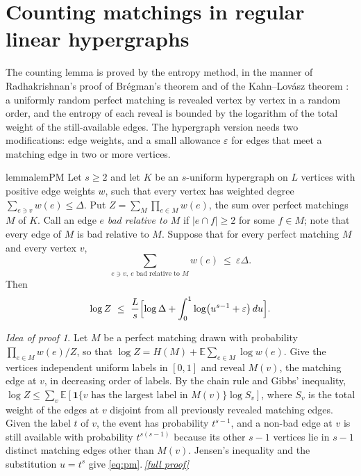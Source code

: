 \documentclass[11pt,a4paper]{article}
\theoremstyle{plain}
\theoremstyle{definition}
\theoremstyle{remark}
\newtheorem*{proofidea}{Idea of proof}
\newcommand{\fullproofref}[1]{\,\hyperref[#1]{\textit{[full proof]}}}
\newcommand{\E}{\mathbb E}
\newcommand{\ind}{\mathbf 1}
\begin{document}
\section{Counting matchings in regular linear hypergraphs}\label{sec:count}

The counting lemma is proved by the entropy method, in the manner of Radhakrishnan's proof of Br\'egman's theorem \cite{Bregman73,Radhakrishnan97} and of the Kahn--Lov\'asz theorem \cite{AF08,CR11}: a uniformly random perfect matching is revealed vertex by vertex in a random order, and the entropy of each reveal is bounded by the logarithm of the total weight of the still-available edges. The hypergraph version needs two modifications: edge weights, and a small allowance $\varepsilon$ for edges that meet a matching edge in two or more vertices.

\begin{restatable}{lemma}{lemPM}\label{lem:pm}
Let $s\ge2$ and let $K$ be an $s$-uniform hypergraph on $L$ vertices with positive edge weights $w$, such that every vertex has weighted degree $\sum_{e\ni v}w(e)\le\Delta$. Put $Z=\sum_{M}\prod_{e\in M}w(e)$, the sum over perfect matchings $M$ of $K$. Call an edge $e$ \emph{bad relative to $M$} if $|e\cap f|\ge2$ for some $f\in M$; note that every edge of $M$ is bad relative to $M$. Suppose that for every perfect matching $M$ and every vertex $v$,
\begin{equation}\label{eq:badhyp}
\sum_{e\ni v,\ e\text{ bad relative to }M}w(e)\ \le\ \varepsilon\Delta .
\end{equation}
Then
\begin{equation}\label{eq:pm}
\log Z\ \le\ \frac Ls\Bigl[\log\Delta+\int_0^1\log\bigl(u^{s-1}+\varepsilon\bigr)\,du\Bigr].
\end{equation}
\end{restatable}

\begin{proofidea}
Let $M$ be a perfect matching drawn with probability $\prod_{e\in M}w(e)/Z$, so that $\log Z=H(M)+\E\sum_{e\in M}\log w(e)$. Give the vertices independent uniform labels in $[0,1]$ and reveal $M(v)$, the matching edge at $v$, in decreasing order of labels. By the chain rule and Gibbs' inequality, $\log Z\le\sum_v\E[\ind\{v\text{ has the largest label in }M(v)\}\log S_v]$, where $S_v$ is the total weight of the edges at $v$ disjoint from all previously revealed matching edges. Given the label $t$ of $v$, the event has probability $t^{s-1}$, and a non-bad edge at $v$ is still available with probability $t^{s(s-1)}$ because its other $s-1$ vertices lie in $s-1$ distinct matching edges other than $M(v)$. Jensen's inequality and the substitution $u=t^s$ give \eqref{eq:pm}.\fullproofref{pf:pm}
\end{proofidea}
\end{document}
